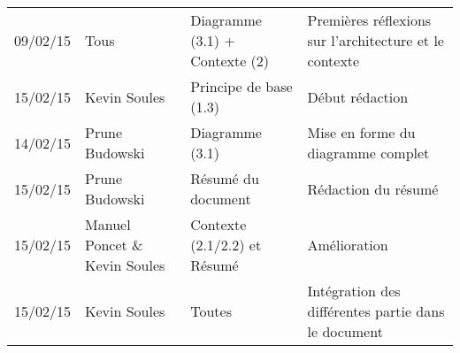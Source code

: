 \small
\begin{tabular}{|p{1.5cm}| >{\raggedright}p{2.5cm}|p{2.5cm}|p{8.5cm}|}
  \hline
  \rowcolor{Gainsboro} \color{Navy}{\bfseries Date}  & \color{Navy}{\bfseries Auteur} & \color{Navy}{\bfseries Section(s)}  &\color{Navy}{\bfseries Commentaires} \\
  \hline
  09/02/15 & Tous & Diagramme (3.1) + Contexte (2) & Premières réflexions sur l'architecture et le contexte\\
  \hline
  15/02/15 & Kevin Soules & Principe de base (1.3)  & Début rédaction\\
  \hline
  14/02/15 & Prune Budowski & Diagramme (3.1) & Mise en forme du diagramme complet\\
  \hline
  15/02/15 & Prune Budowski & Résumé du document & Rédaction du résumé\\
  \hline
  15/02/15 & Manuel Poncet \& Kevin Soules & Contexte (2.1/2.2) et Résumé & Amélioration\\
  \hline
  15/02/15 & Kevin Soules & Toutes & Intégration des différentes partie dans le document\\
  \hline
\end{tabular}
\normalsize
